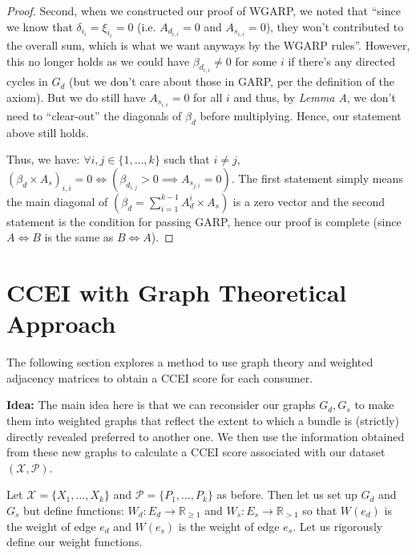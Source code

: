 \documentclass{article} %
\begin{document}
\begin{proof}
Second, when we constructed our proof of WGARP, we noted that ``since we know that $\delta_{i_i}=\xi_{i_i}=0$ (i.e. $A_{d_{i,i}}=0$ and $A_{s_{i,i}}=0$), they won't contributed to the overall sum, which is what we want anyways by the WGARP rules''. However, this no longer holds as we could have $\beta_{d_{i,i}}\not=0$ for some $i$ if there's any directed cycles in $G_d$ (but we don't care about those in GARP, per the definition of the axiom). But we do still have $A_{s_{i,i}}=0$ for all $i$ and thus, by \textit{Lemma A}, we don't need to ``clear-out'' the diagonals of $\beta_d$ before multiplying. Hence, our statement above still holds. 

Thus, we have: $\forall i, j\in\{1,\ldots,k\}$ such that $i\not=j$, $(\beta_d\times A_s)_{i,i}=0 \iff (\beta_{d_{i,j}}>0 \implies A_{s_{j,i}}=0)$. The first statement simply means the main diagonal of $(\beta_d=\sum_{i=1}^{k-1}A_{d}^{i}\times A_s)$ is a zero vector and the second statement is the condition for passing GARP, hence our proof is complete (since $A\iff B$ is the same as $B\iff A$).
\end{proof}

\section{CCEI with Graph Theoretical Approach}

The following section explores a method to use graph theory and weighted adjacency matrices to obtain a CCEI score for each consumer. 
\bigskip

\textbf{Idea:} The main idea here is that we can reconsider our graphs $G_d, G_s$ to make them into weighted graphs that reflect the extent to which a bundle is (strictly) directly revealed preferred to another one. We then use the information obtained from these new graphs to calculate a CCEI score associated with our dataset $(\mathcal{X},\mathcal{P})$.
\bigskip

Let $\mathcal{X}=\{X_1,\ldots,X_k\}$ and $\mathcal{P}=\{P_1,\ldots,P_k\}$ as before. Then let us set up $G_d$ and $G_s$ but define functions: $W_d:E_d \to\mathbb{R}_{\geq1}$ and $W_s:E_s \to\mathbb{R}_{>1}$ so that $W(e_d)$ is the weight of edge $e_d$ and $W(e_s)$ is the weight of edge $e_s$. Let us rigorously define our weight functions.
\bigskip
\end{document}
